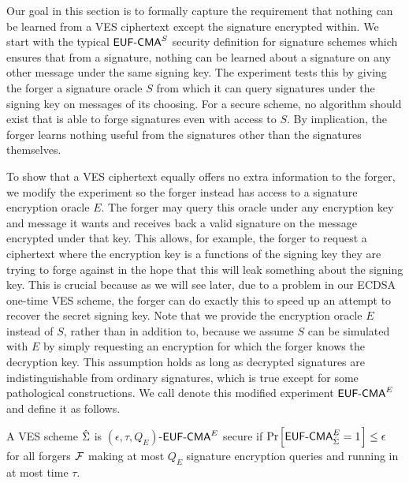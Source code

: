 Our goal in this section is to formally capture the requirement that nothing can be learned from a VES ciphertext except the signature encrypted within.
We start with the typical $\textsf{EUF-CMA}^S$ security definition for signature schemes which ensures that from a signature, nothing can be learned about a signature on any other message under the same signing key.
The experiment tests this by giving the forger a signature oracle $S$ from which it can query signatures under the signing key on messages of its choosing.
For a secure scheme, no algorithm should exist that is able to forge signatures even with access to $S$.
By implication, the forger learns nothing useful from the signatures other than the signatures themselves.

To show that a VES ciphertext equally offers no extra information to the forger, we modify the experiment so the forger instead has access to a signature encryption oracle $E$.
The forger may query this oracle under any encryption key and message it wants and receives back a valid signature on the message encrypted under that key.
This allows, for example, the forger to request a ciphertext where the encryption key is a functions of the signing key they are trying to forge against in the hope that this will leak something about the signing key.
This is crucial because as we will see later, due to a problem in our ECDSA one-time VES scheme, the forger can do exactly this to speed up an attempt to recover the secret signing key.
Note that we provide the encryption oracle $E$ instead of $S$, rather than in addition to, because we assume $S$ can be simulated with $E$ by simply requesting an encryption for which the forger knows the decryption key.
This assumption holds as long as decrypted signatures are indistinguishable from ordinary signatures, which is true except for some pathological constructions\cite{calderon2014rethinking}.
We call denote this modified experiment $\EUFCMAVES$ and define it as follows.

\begin{definition}[$\EUFCMAVES$]
  A VES scheme $\hat{\Sigma}$ is $(\epsilon, \tau, Q_E)$-$\EUFCMAVES$ secure if $\prob{ \EUFCMAVES_{\hat{\Sigma}} = 1} \leq \epsilon$ for all forgers $\mathcal{F}$ making at most $Q_E$ signature encryption queries and running in at most time $\tau$.
\begin{center}
\end{center}
\end{definition}

